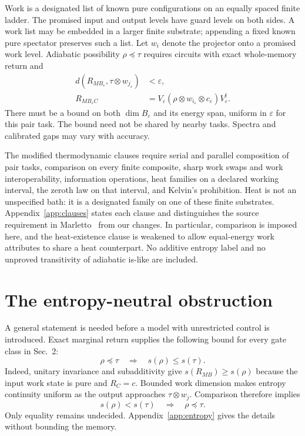 \documentclass[11pt,a4paper]{article}
\begin{document}
Work is a designated list of known pure configurations on an equally spaced finite ladder. The promised input and output levels have guard levels on both sides. A work list may be embedded in a larger finite substrate; appending a fixed known pure spectator preserves such a list. Let $w_i$ denote the projector onto a promised work level. Adiabatic possibility $\rho\preceq\tau$ requires circuits with exact whole-memory return and
\begin{equation}
\begin{split}
 d(R_{MB_\varepsilon},\tau\otimes w_{j_\varepsilon})&<\varepsilon,\\
 R_{MB_\varepsilon C}&=V_\varepsilon(\rho\otimes w_{i_\varepsilon}\otimes c_\varepsilon)V_\varepsilon^\dagger.
\end{split} \label{eq:adiabatic}
\end{equation}
There must be a bound on both $\dim B_\varepsilon$ and its energy span, uniform in $\varepsilon$ for this pair task. The bound need not be shared by nearby tasks. Spectra and calibrated gaps may vary with accuracy.

The modified thermodynamic clauses require serial and parallel composition of pair tasks, comparison on every finite composite, sharp work swaps and work interoperability, information operations, heat families on a declared working interval, the zeroth law on that interval, and Kelvin's prohibition. Heat is not an unspecified bath: it is a designated family on one of these finite substrates. Appendix~\ref{app:clauses} states each clause and distinguishes the source requirement in Marletto~\cite{marletto} from our changes. In particular, comparison is imposed here, and the heat-existence clause is weakened to allow equal-energy work attributes to share a heat counterpart. No additive entropy label and no unproved transitivity of adiabatic is-like are included.

\section{The entropy-neutral obstruction}
A general statement is needed before a model with unrestricted control is introduced. Exact marginal return supplies the following bound for every gate class in Sec.~2:
\begin{equation}
 \rho\preceq\tau\quad\Longrightarrow\quad s(\rho)\le s(\tau). \label{eq:monotonicity}
\end{equation}
Indeed, unitary invariance and subadditivity give $s(R_{MB})\ge s(\rho)$ because the input work state is pure and $R_C=c$. Bounded work dimension makes entropy continuity uniform as the output approaches $\tau\otimes w_j$. Comparison therefore implies
\begin{equation}
 s(\rho)<s(\tau)\quad\Longrightarrow\quad\rho\preceq\tau. \label{eq:strict}
\end{equation}
Only equality remains undecided. Appendix~\ref{app:entropy} gives the details without bounding the memory.
\end{document}
